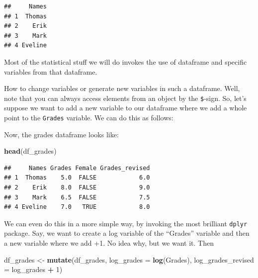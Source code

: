 \documentclass[]{article}
\newenvironment{Shaded}{\begin{snugshade}}{\end{snugshade}}
\newcommand{\KeywordTok}[1]{\textcolor[rgb]{0.13,0.29,0.53}{\textbf{#1}}}
\newcommand{\DataTypeTok}[1]{\textcolor[rgb]{0.13,0.29,0.53}{#1}}
\newcommand{\DecValTok}[1]{\textcolor[rgb]{0.00,0.00,0.81}{#1}}
\newcommand{\StringTok}[1]{\textcolor[rgb]{0.31,0.60,0.02}{#1}}
\newcommand{\OperatorTok}[1]{\textcolor[rgb]{0.81,0.36,0.00}{\textbf{#1}}}
\newcommand{\NormalTok}[1]{#1}
\theoremstyle{definition}
\theoremstyle{definition}
\theoremstyle{definition}
\theoremstyle{remark}
\begin{document}
\begin{verbatim}
##     Names
## 1  Thomas
## 2    Erik
## 3    Mark
## 4 Eveline
\end{verbatim}

Most of the statistical stuff we will do invokes the use of dataframe
and specific variables from that dataframe.

How to change variables or generate new variables in such a dataframe.
Well, note that you can always access elements from an object by the
\texttt{\$}-sign. So, let's suppose we want to add a new variable to our
dataframe where we add a whole point to the \texttt{Grades} variable. We
can do this as follows:

\begin{Shaded}
\end{Shaded}

Now, the grades dataframe looks like:

\begin{Shaded}
\begin{Highlighting}[]
\KeywordTok{head}\NormalTok{(df_grades)}
\end{Highlighting}
\end{Shaded}

\begin{verbatim}
##     Names Grades Female Grades_revised
## 1  Thomas    5.0  FALSE            6.0
## 2    Erik    8.0  FALSE            9.0
## 3    Mark    6.5  FALSE            7.5
## 4 Eveline    7.0   TRUE            8.0
\end{verbatim}

We can even do this in a more simple way, by invoking the most brilliant
\texttt{dplyr} package. Say, we want to create a log variable of the
``Grades'' variable and then a new variable where we add +1. No idea
why, but we want it. Then

\begin{Shaded}
\begin{Highlighting}[]
\NormalTok{df_grades <-}\StringTok{ }\KeywordTok{mutate}\NormalTok{(df_grades, }
               \DataTypeTok{log_grades =} \KeywordTok{log}\NormalTok{(Grades),}
               \DataTypeTok{log_grades_revised =}\NormalTok{ log_grades }\OperatorTok{+}\StringTok{ }\DecValTok{1}\NormalTok{)}
\end{Highlighting}
\end{Shaded}
\end{document}
